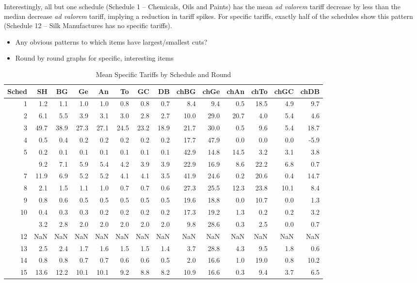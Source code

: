\documentclass[
  12pt,
]{article}
\begin{document}
Interestingly, all but one schedule (Schedule 1 -- Chemicals, Oils and Paints) has the mean \emph{ad valorem} tariff decrease by less than the median decrease \emph{ad valorem} tariff, implying a reduction in tariff spikes. For specific tariffs, exactly half of the schedules show this pattern (Schedule 12 -- Silk Manufactures has no specific tariffs).

\begin{itemize}
\item
  Any obvious patterns to which items have largest/smallest cuts?
\item
  Round by round graphs for specific, interesting items
\end{itemize}

\begin{table}[!h]

\caption{\label{tab:sp-sc-rd}Mean Specific Tariffs by Schedule and Round}
\centering
\begin{tabular}[t]{rrrrrrrrrrrrrr}
\toprule
Sched & SH & BG & Ge & An & To & GC & DB & chBG & chGe & chAn & chTo & chGC & chDB\\
\midrule
1 & 1.2 & 1.1 & 1.0 & 1.0 & 0.8 & 0.8 & 0.7 & 8.4 & 9.4 & 0.5 & 18.5 & 4.9 & 9.7\\
2 & 6.1 & 5.5 & 3.9 & 3.1 & 3.0 & 2.8 & 2.7 & 10.0 & 29.0 & 20.7 & 4.0 & 5.4 & 4.6\\
3 & 49.7 & 38.9 & 27.3 & 27.1 & 24.5 & 23.2 & 18.9 & 21.7 & 30.0 & 0.5 & 9.6 & 5.4 & 18.7\\
4 & 0.5 & 0.4 & 0.2 & 0.2 & 0.2 & 0.2 & 0.2 & 17.7 & 47.9 & 0.0 & 0.0 & 0.0 & -5.9\\
5 & 0.2 & 0.1 & 0.1 & 0.1 & 0.1 & 0.1 & 0.1 & 42.9 & 14.8 & 14.5 & 3.2 & 3.1 & 3.8\\
\addlinespace
6 & 9.2 & 7.1 & 5.9 & 5.4 & 4.2 & 3.9 & 3.9 & 22.9 & 16.9 & 8.6 & 22.2 & 6.8 & 0.7\\
7 & 11.9 & 6.9 & 5.2 & 5.2 & 4.1 & 4.1 & 3.5 & 41.9 & 24.6 & 0.2 & 20.6 & 0.4 & 14.7\\
8 & 2.1 & 1.5 & 1.1 & 1.0 & 0.7 & 0.7 & 0.6 & 27.3 & 25.5 & 12.3 & 23.8 & 10.1 & 8.4\\
9 & 0.8 & 0.6 & 0.5 & 0.5 & 0.5 & 0.5 & 0.5 & 19.6 & 18.8 & 0.0 & 10.7 & 0.0 & 1.3\\
10 & 0.4 & 0.3 & 0.3 & 0.2 & 0.2 & 0.2 & 0.2 & 17.3 & 19.2 & 1.3 & 0.2 & 0.2 & 3.2\\
\addlinespace
11 & 3.2 & 2.8 & 2.0 & 2.0 & 2.0 & 2.0 & 2.0 & 9.8 & 28.6 & 0.3 & 2.5 & 0.0 & 0.7\\
12 & NaN & NaN & NaN & NaN & NaN & NaN & NaN & NaN & NaN & NaN & NaN & NaN & NaN\\
13 & 2.5 & 2.4 & 1.7 & 1.6 & 1.5 & 1.5 & 1.4 & 3.7 & 28.8 & 4.3 & 9.5 & 1.8 & 0.6\\
14 & 0.8 & 0.8 & 0.7 & 0.7 & 0.6 & 0.6 & 0.5 & 2.0 & 16.6 & 1.0 & 19.0 & 0.8 & 10.2\\
15 & 13.6 & 12.2 & 10.1 & 10.1 & 9.2 & 8.8 & 8.2 & 10.9 & 16.6 & 0.3 & 9.4 & 3.7 & 6.5\\
\bottomrule
\end{tabular}
\end{table}
\end{document}
